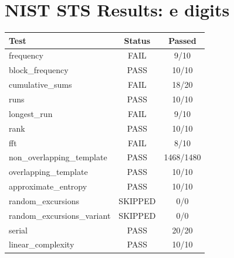 \documentclass{article}
\begin{document}
\section*{NIST STS Results: e digits}
\begin{tabular}{lcc}
\toprule
Test & Status & Passed \\
\midrule
frequency & FAIL & 9/10 \\
block_frequency & PASS & 10/10 \\
cumulative_sums & FAIL & 18/20 \\
runs & PASS & 10/10 \\
longest_run & FAIL & 9/10 \\
rank & PASS & 10/10 \\
fft & FAIL & 8/10 \\
non_overlapping_template & PASS & 1468/1480 \\
overlapping_template & PASS & 10/10 \\
approximate_entropy & PASS & 10/10 \\
random_excursions & SKIPPED & 0/0 \\
random_excursions_variant & SKIPPED & 0/0 \\
serial & PASS & 20/20 \\
linear_complexity & PASS & 10/10 \\
\bottomrule
\end{tabular}
\end{document}
